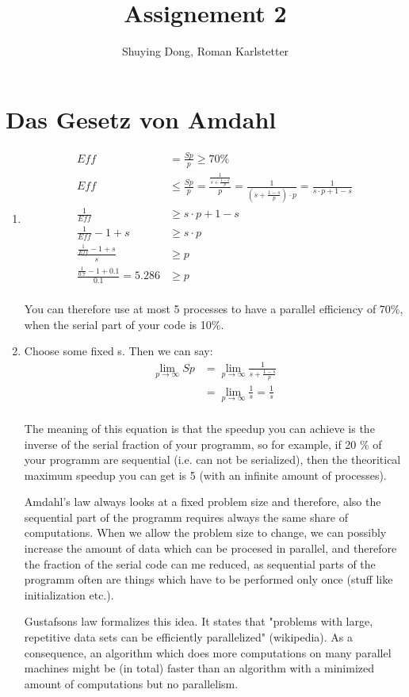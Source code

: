 \documentclass[a4paper,10pt]{article}
\title{Assignement 2}
\author{Shuying Dong, Roman Karlstetter}
\begin{document}
\section{Das Gesetz von Amdahl}
\renewcommand{\labelenumi}{\alph{enumi})}
\begin{enumerate}
 \item 
\begin{align*}
Eff &= \frac{Sp}{p} \geq 70 \% \\
Eff &\leq  \frac{Sp}{p} = \frac{\frac{1}{s+{\frac{1-s}{p}}}}{p} = \frac{1}{(s+{\frac{1-s}{p}}) \cdot p}  = \frac{1}{s\cdot p+1-s}\\
\frac{1}{Eff} &\geq  s\cdot p+1-s\\
\frac{1}{Eff} -1 + s &\geq  s\cdot p\\
\frac{\frac{1}{Eff} -1 + s}{s} &\geq  p\\
\frac{\frac{1}{0.7} -1 + 0.1}{0.1} = 5.286 &\geq  p\\
\end{align*}

You can therefore use at most 5 processes to have a parallel efficiency of 70\%, when the serial part of your code is 10\%.
\item 
Choose some fixed s. Then we can say: 
\begin{align*}
 \lim\limits_{p \rightarrow \infty}{Sp} &= \lim\limits_{p \rightarrow \infty}{\frac{1}{s+{\frac{1-s}{p}}}}\\
&= \lim\limits_{p \rightarrow \infty}{\frac{1}{s}} = \frac{1}{s}\\
\end{align*}

The meaning of this equation is that the speedup you can achieve is the inverse of the serial fraction of your programm, so for example, if 20 \% of your programm are sequential (i.e. can not be serialized), then the theoritical maximum speedup you can get is 5 (with an infinite amount of processes).

Amdahl's law always looks at a fixed problem size and therefore, also the sequential part of the programm requires always the same share of computations. When we allow the problem size to change, we can possibly increase the amount of data which can be procesed in parallel, and therefore the fraction of the serial code can me reduced, as sequential parts of the programm often are things which have to be performed only once (stuff like initialization etc.). 

Gustafsons law formalizes this idea. It states that "problems with large, repetitive data sets can be efficiently parallelized" (wikipedia). As a consequence, an algorithm which does more computations on many parallel machines might be (in total) faster than an algorithm with a minimized amount of computations but no parallelism.
\end{enumerate}
\end{document}
